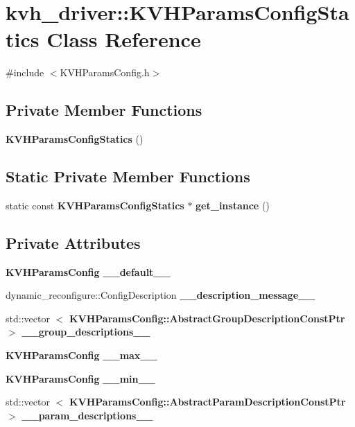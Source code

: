 \section{kvh\-\_\-driver\-:\-:\-K\-V\-H\-Params\-Config\-Statics \-Class \-Reference}
\label{classkvh__driver_1_1KVHParamsConfigStatics}


{\ttfamily \#include $<$\-K\-V\-H\-Params\-Config.\-h$>$}

\subsection*{\-Private \-Member \-Functions}
\begin{DoxyCompactItemize}
\item 
{\bf \-K\-V\-H\-Params\-Config\-Statics} ()
\end{DoxyCompactItemize}
\subsection*{\-Static \-Private \-Member \-Functions}
\begin{DoxyCompactItemize}
\item 
static const \*
{\bf \-K\-V\-H\-Params\-Config\-Statics} $\ast$ {\bf get\-\_\-instance} ()
\end{DoxyCompactItemize}
\subsection*{\-Private \-Attributes}
\begin{DoxyCompactItemize}
\item 
{\bf \-K\-V\-H\-Params\-Config} {\bf \-\_\-\-\_\-default\-\_\-\-\_\-}
\item 
dynamic\-\_\-reconfigure\-::\-Config\-Description {\bf \-\_\-\-\_\-description\-\_\-message\-\_\-\-\_\-}
\item 
std\-::vector\*
$<$ {\bf \-K\-V\-H\-Params\-Config\-::\-Abstract\-Group\-Description\-Const\-Ptr} $>$ {\bf \-\_\-\-\_\-group\-\_\-descriptions\-\_\-\-\_\-}
\item 
{\bf \-K\-V\-H\-Params\-Config} {\bf \-\_\-\-\_\-max\-\_\-\-\_\-}
\item 
{\bf \-K\-V\-H\-Params\-Config} {\bf \-\_\-\-\_\-min\-\_\-\-\_\-}
\item 
std\-::vector\*
$<$ {\bf \-K\-V\-H\-Params\-Config\-::\-Abstract\-Param\-Description\-Const\-Ptr} $>$ {\bf \-\_\-\-\_\-param\-\_\-descriptions\-\_\-\-\_\-}
\end{DoxyCompactItemize}
